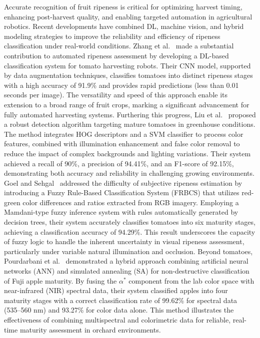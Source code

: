 \documentclass[a4paper,fleqn]{cas-dc}
\begin{document}
Accurate recognition of fruit ripeness is critical for optimizing harvest timing, enhancing post-harvest quality, and enabling targeted automation in agricultural robotics. Recent developments have combined DL, machine vision, and hybrid modeling strategies to improve the reliability and efficiency of ripeness classification under real-world conditions.
Zhang et al.~\cite{zhang2018deep} made a substantial contribution to automated ripeness assessment by developing a DL-based classification system for tomato harvesting robots. Their CNN model, supported by data augmentation techniques, classifies tomatoes into distinct ripeness stages with a high accuracy of 91.9\% and provides rapid predictions (less than 0.01 seconds per image). The versatility and speed of this approach enable its extension to a broad range of fruit crops, marking a significant advancement for fully automated harvesting systems.
Furthering this progress, Liu et al.~\cite{liu2019mature} proposed a robust detection algorithm targeting mature tomatoes in greenhouse conditions. The method integrates HOG descriptors and a SVM classifier to process color features, combined with illumination enhancement and false color removal to reduce the impact of complex backgrounds and lighting variations. Their system achieved a recall of 90\%, a precision of 94.41\%, and an F1-score of 92.15\%, demonstrating both accuracy and reliability in challenging growing environments.
Goel and Sehgal~\cite{goel2015fuzzy} addressed the difficulty of subjective ripeness estimation by introducing a Fuzzy Rule-Based Classification System (FRBCS) that utilizes red-green color differences and ratios extracted from RGB imagery. Employing a Mamdani-type fuzzy inference system with rules automatically generated by decision trees, their system accurately classifies tomatoes into six maturity stages, achieving a classification accuracy of 94.29\%. This result underscores the capacity of fuzzy logic to handle the inherent uncertainty in visual ripeness assessment, particularly under variable natural illumination and occlusion.
Beyond tomatoes, Pourdarbani et al.~\cite{pourdarbani2020automatic} demonstrated a hybrid approach combining artificial neural networks (ANN) and simulated annealing (SA) for non-destructive classification of Fuji apple maturity. By fusing the $\alpha^*$ component from the lab color space with near-infrared (NIR) spectral data, their system classified apples into four maturity stages with a correct classification rate of 99.62\% for spectral data (535–560 nm) and 93.27\% for color data alone. This method illustrates the effectiveness of combining multispectral and colorimetric data for reliable, real-time maturity assessment in orchard environments.
\end{document}
